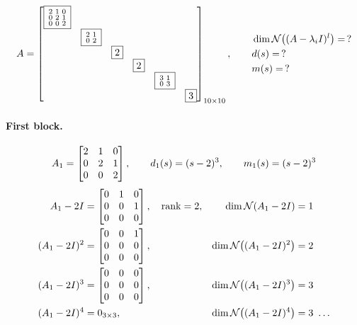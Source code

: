 \begin{example}
\[
A=\begin{bmatrix}
\boxed{\begin{smallmatrix}2&1&0\\0&2&1\\0&0&2\end{smallmatrix}} & & & & & \\
& \boxed{\begin{smallmatrix}2&1\\0&2\end{smallmatrix}} & & & & \\
& & \boxed{2} & & & \\
& & & \boxed{2} & & \\
& & & & \boxed{\begin{smallmatrix}3&1\\0&3\end{smallmatrix}} & \\
& & & & & \boxed{3}
\end{bmatrix}_{10\times10},
\qquad
\begin{aligned}
&\dim\mathcal{N}\big((A-\lambda_iI)^l\big)=\,?\\
&d(s)=\,?\\
&m(s)=\,?
\end{aligned}
\]

\paragraph{First block.}
\[
A_1=\begin{bmatrix}2&1&0\\0&2&1\\0&0&2\end{bmatrix},\qquad d_1(s)=(s-2)^3,\qquad m_1(s)=(s-2)^3
\]
\begin{align*}
A_1-2I&=\begin{bmatrix}0&1&0\\0&0&1\\0&0&0\end{bmatrix},\quad \operatorname{rank}=2, & \dim\mathcal{N}(A_1-2I)&=1\\
(A_1-2I)^2&=\begin{bmatrix}0&0&1\\0&0&0\\0&0&0\end{bmatrix}, & \dim\mathcal{N}\big((A_1-2I)^2\big)&=2\\
(A_1-2I)^3&=\begin{bmatrix}0&0&0\\0&0&0\\0&0&0\end{bmatrix}, & \dim\mathcal{N}\big((A_1-2I)^3\big)&=3\\
(A_1-2I)^4&=0_{3\times3}, & \dim\mathcal{N}\big((A_1-2I)^4\big)&=3\ \dots
\end{align*}


\end{example}
